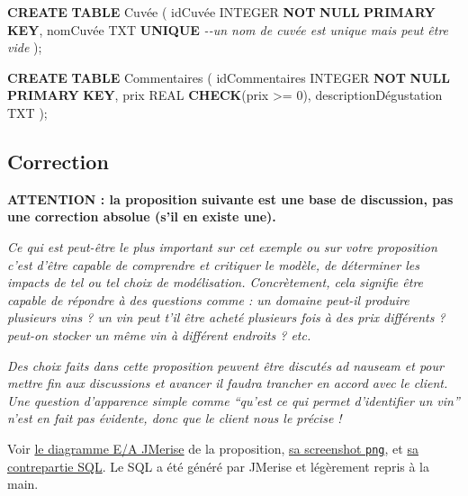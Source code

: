 \documentclass[11pt]{article}
\newenvironment{Shaded}{}{}
\newcommand{\KeywordTok}[1]{\textcolor[rgb]{0.00,0.44,0.13}{\textbf{{#1}}}}
\newcommand{\DataTypeTok}[1]{\textcolor[rgb]{0.56,0.13,0.00}{{#1}}}
\newcommand{\DecValTok}[1]{\textcolor[rgb]{0.25,0.63,0.44}{{#1}}}
\newcommand{\CommentTok}[1]{\textcolor[rgb]{0.38,0.63,0.69}{\textit{{#1}}}}
\newcommand{\NormalTok}[1]{{#1}}
\newcommand{\OperatorTok}[1]{\textcolor[rgb]{0.40,0.40,0.40}{{#1}}}
\begin{document}
\begin{Shaded}
\begin{Highlighting}[]
\KeywordTok{CREATE} \KeywordTok{TABLE}\NormalTok{ Cuvée (}
\NormalTok{    idCuvée }\DataTypeTok{INTEGER} \KeywordTok{NOT} \KeywordTok{NULL} \KeywordTok{PRIMARY} \KeywordTok{KEY}\NormalTok{,}
\NormalTok{    nomCuvée TXT }\KeywordTok{UNIQUE}   \CommentTok{{-}{-}un nom de cuvée est unique mais peut être vide}
\NormalTok{    );}

\KeywordTok{CREATE} \KeywordTok{TABLE}\NormalTok{ Commentaires (}
\NormalTok{    idCommentaires }\DataTypeTok{INTEGER} \KeywordTok{NOT} \KeywordTok{NULL} \KeywordTok{PRIMARY} \KeywordTok{KEY}\NormalTok{,}
\NormalTok{    prix }\DataTypeTok{REAL} \KeywordTok{CHECK}\NormalTok{(prix }\OperatorTok{>=} \DecValTok{0}\NormalTok{),}
\NormalTok{    descriptionDégustation TXT}
\NormalTok{    );}
\end{Highlighting}
\end{Shaded}

    \hypertarget{correction}{%
\subsection{Correction}\label{correction}}

\textbf{ATTENTION : la proposition suivante est une base de discussion,
pas une correction absolue (s'il en existe une).}

\emph{Ce qui est peut-être le plus important sur cet exemple ou sur
votre proposition c'est d'être capable de comprendre et critiquer le
modèle, de déterminer les impacts de tel ou tel choix de modélisation.
Concrètement, cela signifie être capable de répondre à des questions
comme : un domaine peut-il produire plusieurs vins ? un vin peut t'il
être acheté plusieurs fois à des prix différents ? peut-on stocker un
même vin à différent endroits ? etc.}

\emph{Des choix faits dans cette proposition peuvent être discutés ad
nauseam et pour mettre fin aux discussions et avancer il faudra trancher
en accord avec le client. Une question d'apparence simple comme ``qu'est
ce qui permet d'identifier un vin'' n'est en fait pas évidente, donc que
le client nous le précise !}

Voir \href{cas_d_etude_modelisation.mcd}{le diagramme E/A JMerise} de la
proposition, \href{correction/cas_d_etude_modelisation.png}{sa
screenshot \texttt{png}}, et
\href{correction/cas_d_etude_modelisation.sql}{sa contrepartie SQL}. Le
SQL a été généré par JMerise et légèrement repris à la main.
\end{document}
